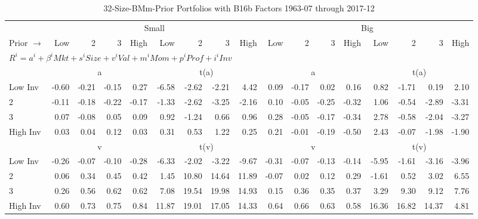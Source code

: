 
\begin{table}[!ht]
\footnotesize
\centering
\caption{32-Size-BMm-Prior Portfolios with B16b Factors 1963-07 through 2017-12}
\begin{tabular}{lrrrrrrrrrrrrrrrr}
  \toprule
    & \multicolumn{8}{c}{Small} & \multicolumn{8}{c}{Big} \\
      \cmidrule(r){2-9} \cmidrule(r){10-17}
    Prior $\rightarrow$ & Low & 2 & 3 & High & Low & 2 & 3 & High & Low & 2 & 3 & High & Low & 2 & 3 & High \\ 
  \midrule
  \multicolumn{17}{l}{$R^i=a^i+\beta^iMkt+s^iSize+v^iVal+m^iMom+p^iProf+i^iInv$} \\

  
    
      & \multicolumn{4}{c}{a} & \multicolumn{4}{c}{t(a)}
    
      & \multicolumn{4}{c}{a} & \multicolumn{4}{c}{t(a)}
    
    \\
      \cmidrule(r){2-5} \cmidrule(r){6-9} \cmidrule(r){10-13} \cmidrule(r){14-17}

    Low Inv   & -0.60  & -0.21  & -0.15  & 0.27  & -6.58  & -2.62  & -2.21  & 4.42  & 0.09  & -0.17  & 0.02  & 0.16  & 0.82  & -1.71  & 0.19  & 2.10  \\
           2  & -0.11  & -0.18  & -0.22  & -0.17  & -1.33  & -2.62  & -3.25  & -2.16  & 0.10  & -0.05  & -0.25  & -0.32  & 1.06  & -0.54  & -2.89  & -3.31  \\
           3  & 0.07  & -0.08  & 0.05  & 0.09  & 0.92  & -1.24  & 0.66  & 0.96  & 0.28  & -0.05  & -0.17  & -0.34  & 2.78  & -0.58  & -2.04  & -3.27  \\
    High Inv  & 0.03  & 0.04  & 0.12  & 0.03  & 0.31  & 0.53  & 1.22  & 0.25  & 0.21  & -0.01  & -0.19  & -0.50  & 2.43  & -0.07  & -1.98  & -1.90  \\

  
    
      & \multicolumn{4}{c}{v} & \multicolumn{4}{c}{t(v)}
    
      & \multicolumn{4}{c}{v} & \multicolumn{4}{c}{t(v)}
    
    \\
      \cmidrule(r){2-5} \cmidrule(r){6-9} \cmidrule(r){10-13} \cmidrule(r){14-17}

    Low Inv   & -0.26  & -0.07  & -0.10  & -0.28  & -6.33  & -2.02  & -3.22  & -9.67  & -0.31  & -0.07  & -0.13  & -0.14  & -5.95  & -1.61  & -3.16  & -3.96  \\
           2  & 0.06  & 0.34  & 0.45  & 0.42  & 1.45  & 10.80  & 14.64  & 11.89  & -0.07  & 0.02  & 0.12  & 0.29  & -1.61  & 0.52  & 3.02  & 6.55  \\
           3  & 0.26  & 0.56  & 0.62  & 0.62  & 7.08  & 19.54  & 19.98  & 14.93  & 0.15  & 0.36  & 0.35  & 0.37  & 3.29  & 9.30  & 9.12  & 7.76  \\
    High Inv  & 0.60  & 0.73  & 0.75  & 0.84  & 11.87  & 19.01  & 17.05  & 14.33  & 0.64  & 0.66  & 0.63  & 0.58  & 16.36  & 16.82  & 14.37  & 4.81  \\


\end{tabular}
\end{table}
